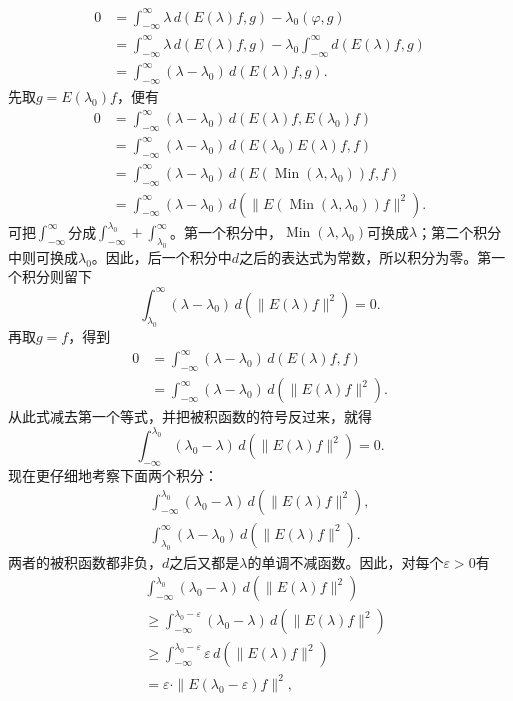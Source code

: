 \documentclass[fontsize=13pt,twoside,openany,headings=normal,parskip=false,bookmarkpackage=false,DIV=calc]{scrbook}
\begin{document}
\hypertarget{origpage-63}{}\label{origpage-63}\begin{align*}
0&=\int_{-\infty}^{\infty}\lambda\,d(E(\lambda)f,g)-\lambda_0(\varphi,g)\\
&=\int_{-\infty}^{\infty}\lambda\,d(E(\lambda)f,g)-\lambda_0\int_{-\infty}^{\infty}d(E(\lambda)f,g)\\
&=\int_{-\infty}^{\infty}(\lambda-\lambda_0)\,d(E(\lambda)f,g).
\end{align*}
先取$g=E(\lambda_0)f$，便有
\begin{align*}
0&=\int_{-\infty}^{\infty}(\lambda-\lambda_0)\,d(E(\lambda)f,E(\lambda_0)f)\\
&=\int_{-\infty}^{\infty}(\lambda-\lambda_0)\,d(E(\lambda_0)E(\lambda)f,f)\\
&=\int_{-\infty}^{\infty}(\lambda-\lambda_0)\,d(E(\operatorname{Min}(\lambda,\lambda_0))f,f)\\
&=\int_{-\infty}^{\infty}(\lambda-\lambda_0)\,d(\|E(\operatorname{Min}(\lambda,\lambda_0))f\|^2).
\end{align*}
可把$\int_{-\infty}^{\infty}$分成$\int_{-\infty}^{\lambda_0}+\int_{\lambda_0}^{\infty}$。第一个积分中，$\operatorname{Min}(\lambda,\allowbreak \lambda_0)$可换成$\lambda$；第二个积分中则可换成$\lambda_0$。因此，后一个积分中$d$之后的表达式为常数，所以积分为零。第一个积分则留下
\[
\int_{\lambda_0}^{\infty}(\lambda-\lambda_0)\,d(\|E(\lambda)f\|^2)=0.
\]
再取$g=f$，得到
\begin{align*}
0&=\int_{-\infty}^{\infty}(\lambda-\lambda_0)\,d(E(\lambda)f,f)\\
&=\int_{-\infty}^{\infty}(\lambda-\lambda_0)\,d(\|E(\lambda)f\|^2).
\end{align*}
从此式减去第一个等式，并把被积函数的符号反过来，就得
\[
\int_{-\infty}^{\lambda_0}(\lambda_0-\lambda)\,d(\|E(\lambda)f\|^2)=0.
\]
现在更仔细地考察下面两个积分：
\begin{gather*}
\int_{-\infty}^{\lambda_0}(\lambda_0-\lambda)\,d(\|E(\lambda)f\|^2),\\
\int_{\lambda_0}^{\infty}(\lambda-\lambda_0)\,d(\|E(\lambda)f\|^2).
\end{gather*}
两者的被积函数都非负，$d$之后又都是$\lambda$的单调不减函数。因此，对每个$\varepsilon>0$有
\begin{align*}
&\int_{-\infty}^{\lambda_0}(\lambda_0-\lambda)\,d(\|E(\lambda)f\|^2)\\
&\geq\int_{-\infty}^{\lambda_0-\varepsilon}(\lambda_0-\lambda)\,d(\|E(\lambda)f\|^2)\\
&\geq\int_{-\infty}^{\lambda_0-\varepsilon}\varepsilon\,d(\|E(\lambda)f\|^2)\\
&=\varepsilon\cdot\|E(\lambda_0-\varepsilon)f\|^2,
\end{align*}
\end{document}
